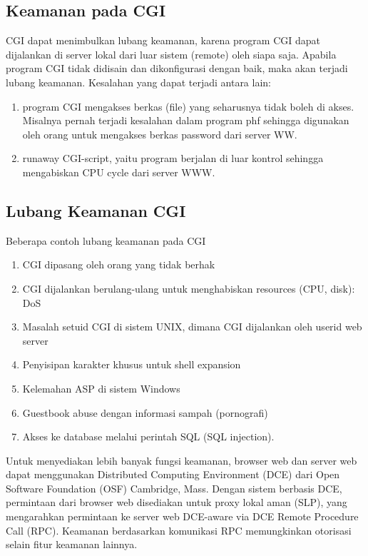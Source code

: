 \subsection{Keamanan pada CGI} 
CGI dapat menimbulkan lubang keamanan, karena program CGI dapat dijalankan di server lokal dari luar sistem (remote) oleh siapa saja. Apabila program CGI tidak didisain dan dikonfigurasi dengan baik, maka akan terjadi lubang keamanan. Kesalahan yang dapat terjadi antara lain: 
\begin{enumerate}
	\item program CGI mengakses berkas (file) yang seharusnya tidak boleh di akses. Misalnya pernah terjadi kesalahan dalam program phf sehingga digunakan oleh orang untuk mengakses berkas password dari server WW. 
	\item runaway CGI-script, yaitu program berjalan di luar kontrol sehingga mengabiskan CPU cycle dari server WWW.
\end{enumerate}

\subsection{Lubang Keamanan CGI} 
Beberapa contoh lubang keamanan pada CGI 
\begin{enumerate}
	\item CGI dipasang oleh orang yang tidak berhak 
	\item CGI dijalankan berulang-ulang untuk menghabiskan resources (CPU, disk): DoS 
	\item Masalah setuid CGI di sistem UNIX, dimana CGI dijalankan oleh userid web server 
	\item Penyisipan karakter khusus untuk shell expansion 
	\item Kelemahan ASP di sistem Windows 
	\item Guestbook abuse dengan informasi sampah (pornografi) 
	\item Akses ke database melalui perintah SQL (SQL injection).
\end {enumerate}
Untuk menyediakan lebih banyak fungsi keamanan, browser web dan server web dapat menggunakan Distributed Computing Environment (DCE) dari Open Software Foundation (OSF) Cambridge, Mass. Dengan sistem berbasis DCE, permintaan dari browser web disediakan untuk proxy lokal aman (SLP), yang mengarahkan permintaan ke server web DCE-aware via DCE Remote Procedure Call (RPC). Keamanan berdasarkan komunikasi RPC memungkinkan otorisasi selain fitur keamanan lainnya.

